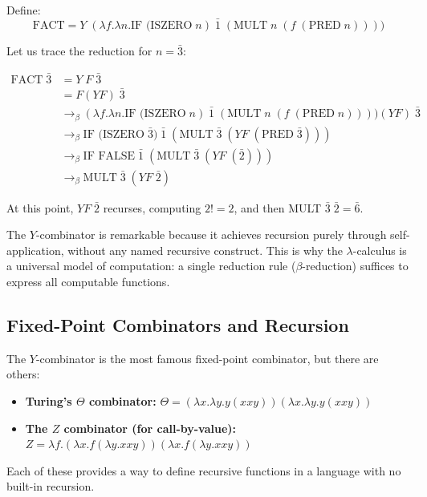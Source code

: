 \begin{example}
Define:
\[
\text{FACT} = Y\; (\lambda f.\lambda n. \text{IF (ISZERO}\; n)\; \bar{1}\; (\text{MULT}\; n\; (f\; (\text{PRED}\; n))))
\]

Let us trace the reduction for $n = \bar{3}$:

\begin{align*}
\text{FACT}\; \bar{3}
&= Y\; F\; \bar{3} \\
&= F(Y F)\; \bar{3} \\
&\to_\beta (\lambda f.\lambda n. \text{IF (ISZERO}\; n)\; \bar{1}\; (\text{MULT}\; n\; (f\; (\text{PRED}\; n)))) (YF)\; \bar{3} \\
&\to_\beta \text{IF (ISZERO}\; \bar{3})\; \bar{1}\; (\text{MULT}\; \bar{3}\; (YF\; (\text{PRED}\; \bar{3}))) \\
&\to_\beta \text{IF FALSE}\; \bar{1}\; (\text{MULT}\; \bar{3}\; (YF\; (\bar{2}))) \\
&\to_\beta \text{MULT}\; \bar{3}\; (YF\; \bar{2})
\end{align*}

At this point, $YF\; \bar{2}$ recurses, computing $2! = 2$, and then MULT $\bar{3}\; \bar{2} = \bar{6}$.

The $Y$-combinator is remarkable because it achieves recursion purely through self-application, without any named recursive construct. This is why the $\lambda$-calculus is a universal model of computation: a single reduction rule ($\beta$-reduction) suffices to express all computable functions.
\end{example}

\subsection{Fixed-Point Combinators and Recursion}
\label{sec:computation:fixedpoint}

The $Y$-combinator is the most famous fixed-point combinator, but there are others:

\begin{itemize}
\item \textbf{Turing's $\Theta$ combinator:} $\Theta = (\lambda x.\lambda y. y(x x y))(\lambda x.\lambda y. y(x x y))$
\item \textbf{The $Z$ combinator (for call-by-value):} $Z = \lambda f.(\lambda x. f(\lambda y. x x y))(\lambda x. f(\lambda y. x x y))$
\end{itemize}

Each of these provides a way to define recursive functions in a language with no built-in recursion.


